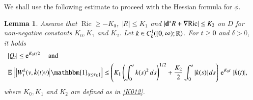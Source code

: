 \documentclass[11pt,reqno]{amsart}
\newtheorem{lemma}[theorem]{Lemma}
\theoremstyle{definition} \newtheorem{remark}[theorem]{Remark}
\numberwithin{equation}{section}
\def\Ric{{\operatorname{Ric}}} \def\Hess{\operatorname{Hess}}
\newcommand\1{\mathbbm{1}}
\def\Ric{{\operatorname{Ric}}} \def\Aut{{\operatorname{Aut}}}
\def\bd{{\bf d}}
\def\r{\right}
\def\l{\left} \def\e{\operatorname{e}} \def\dsum{\displaystyle\sum}
\begin{document}
 We shall use the following estimate to proceed with the Hessian formula for $\phi$.

 \begin{lemma}\label{th3}
Assume that  $\Ric\geq -K_0$, $|R|\leq K_1$ and $|\bd^* R+\nabla \Ric|\leq K_2$ on $D$ for non-negative constants $K_0, K_1$ and $K_2$.   
Let $k\in C_b^{1}([0,\infty);\mathbb{R})$. For $t\geq 0$ and $\delta>0$,
it holds
\begin{align}
  &|Q_t|\leq \e^{K_0t/2}\quad\text{and} \label{Q-est1}\\
  &\E\l[\big|W_{t}^k(v,\dot{k}(t)v)\big|\1_{\{t\leq\tau_D\}}\r]
\leq \l(K_1 \l(\int_0^tk(s)^2\,ds\r)^{1/2}+\frac{K_2}{2}\int_0^t |k(s)|\, ds\r)\,\e^{K_0t} \, |\dot{k}(t)|, \label{Q-est2}
\end{align}
where  $K_0,K_1$ and $K_2$ are defined as in \eqref{K012}.
\end{lemma}
\end{document}
